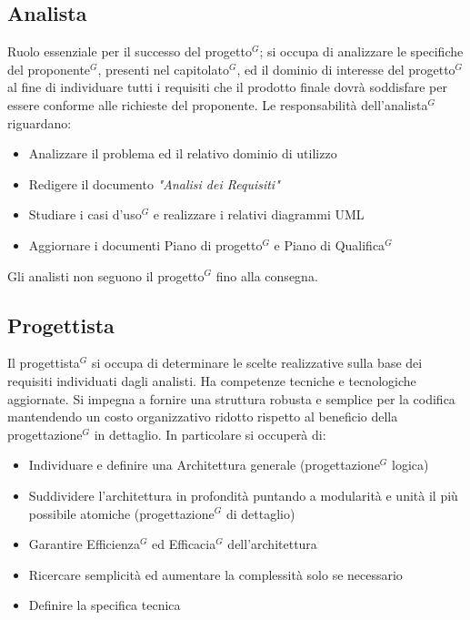 \documentclass[a4paper,10pt]{article}
\begin{document}
\subsection{Analista}
Ruolo essenziale per il successo del progetto$^G$; si occupa di analizzare le specifiche del proponente$^G$, presenti
nel capitolato$^G$, ed il dominio di interesse del progetto$^G$ al fine di individuare tutti i requisiti che il prodotto
finale dovrà soddisfare per essere conforme alle richieste del proponente.
Le responsabilità dell'analista$^G$ riguardano: 
\begin{itemize}
  \item Analizzare il problema ed il relativo dominio di utilizzo
  \item Redigere il documento \textit{"Analisi dei Requisiti"}
  \item Studiare i casi d'uso$^G$ e realizzare i relativi diagrammi UML
  \item Aggiornare i documenti Piano di progetto$^G$ e Piano di Qualifica$^G$
\end{itemize}
Gli analisti non seguono il progetto$^G$ fino alla consegna.
\subsection{Progettista}
Il progettista$^G$ si occupa di determinare le scelte realizzative sulla base dei requisiti individuati dagli analisti.
Ha competenze tecniche e tecnologiche aggiornate. Si impegna a fornire una struttura robusta e semplice per la 
codifica mantendendo un costo organizzativo ridotto rispetto al beneficio della progettazione$^G$ in dettaglio.  
In particolare si occuperà di:
\begin{itemize}
  \item Individuare e definire una Architettura generale (progettazione$^G$ logica)
  \item Suddividere l'architettura in profondità puntando a modularità e unità il più possibile atomiche 
  (progettazione$^G$ di dettaglio)
  \item Garantire Efficienza$^G$ ed Efficacia$^G$ dell'architettura
  \item Ricercare semplicità ed aumentare la complessità solo se necessario
  \item Definire la specifica tecnica
\end{itemize}
\end{document}
